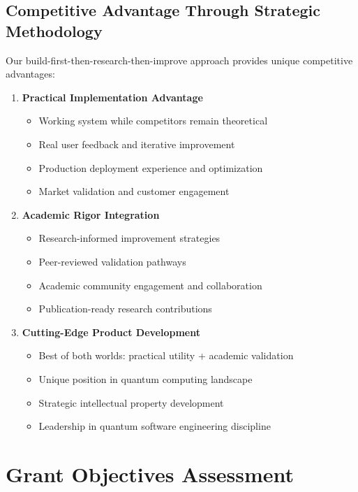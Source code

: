 \documentclass[12pt,a4paper]{article}
\begin{document}
\subsection{Competitive Advantage Through Strategic Methodology}

Our build-first-then-research-then-improve approach provides unique competitive advantages:

\begin{enumerate}
    \item \textbf{Practical Implementation Advantage}
    \begin{itemize}
        \item Working system while competitors remain theoretical
        \item Real user feedback and iterative improvement
        \item Production deployment experience and optimization
        \item Market validation and customer engagement
    \end{itemize}
    
    \item \textbf{Academic Rigor Integration}
    \begin{itemize}
        \item Research-informed improvement strategies
        \item Peer-reviewed validation pathways
        \item Academic community engagement and collaboration
        \item Publication-ready research contributions
    \end{itemize}
    
    \item \textbf{Cutting-Edge Product Development}
    \begin{itemize}
        \item Best of both worlds: practical utility + academic validation
        \item Unique position in quantum computing landscape
        \item Strategic intellectual property development
        \item Leadership in quantum software engineering discipline
    \end{itemize}
\end{enumerate}

\section{Grant Objectives Assessment}
\end{document}
